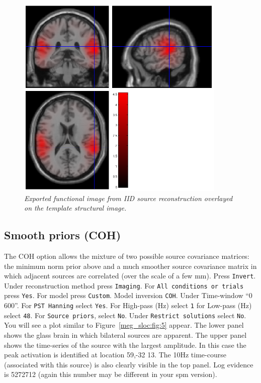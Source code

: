 \begin{figure}
\begin{center}
\includegraphics[width=100mm]{meg_sloc/slide4}
\caption{\em Exported functional image from IID source reconstruction overlayed on the template structural image.\label{meg_sloc:fig:4}}
\end{center}
\end{figure}

\subsection{Smooth priors (COH)}
The COH option allows the mixture of two possible source covariance matrices: the minimum norm prior above and a much smoother source covariance matrix in which adjacent sources are correlated (over the scale of a few mm). Press \texttt{Invert}. Under reconstruction method press \texttt{Imaging}. For \texttt{All conditions or trials} press \texttt{Yes}. For model press \texttt{Custom}. Model inversion \texttt{COH}. Under Time-window ``0 600''. For \texttt{PST Hanning} select \texttt{Yes}. For High-pass (Hz) select \texttt{1} for Low-pass (Hz) select \texttt{48}. For \texttt{Source priors}, select \texttt{No}. Under \texttt{Restrict solutions} select \texttt{No}.   You will see a plot similar to Figure~\ref{meg_sloc:fig:5} appear. The lower panel shows the glass brain in which bilateral sources are apparent. The upper panel shows the time-series of the source with the largest amplitude. In this case the peak activation is identified at location 59,-32 13. The 10Hz time-course (associated with this source) is also clearly visible in the top panel.  Log evidence is 5272712 (again this number may be different in your spm version).

